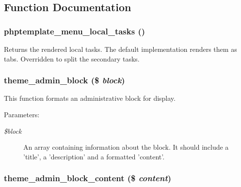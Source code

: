 \subsection{Function Documentation}
\hypertarget{group__themeable_g54599947b2e2792844f0d74846791a55}{
\subsubsection[{phptemplate\_\-menu\_\-local\_\-tasks}]{\setlength{\rightskip}{0pt plus 5cm}phptemplate\_\-menu\_\-local\_\-tasks ()}}
\label{group__themeable_g54599947b2e2792844f0d74846791a55}


Returns the rendered local tasks. The default implementation renders them as tabs. Overridden to split the secondary tasks. \hypertarget{group__themeable_gae7aed78086b8469fa3e21a6dbacbbde}{
\subsubsection[{theme\_\-admin\_\-block}]{\setlength{\rightskip}{0pt plus 5cm}theme\_\-admin\_\-block (\$ {\em block})}}
\label{group__themeable_gae7aed78086b8469fa3e21a6dbacbbde}


This function formats an administrative block for display.

\begin{Desc}
\item[Parameters:]
\begin{description}
\item[{\em \$block}]An array containing information about the block. It should include a 'title', a 'description' and a formatted 'content'. \end{description}
\end{Desc}
\hypertarget{group__themeable_g520c47bce2ec30cc6c834e625a28e169}{
\subsubsection[{theme\_\-admin\_\-block\_\-content}]{\setlength{\rightskip}{0pt plus 5cm}theme\_\-admin\_\-block\_\-content (\$ {\em content})}}
\label{group__themeable_g520c47bce2ec30cc6c834e625a28e169}


